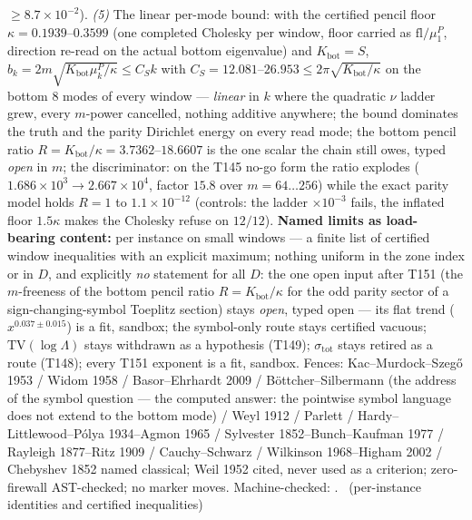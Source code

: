 \documentclass[11pt,a4paper]{article}
\begin{document}
$\ge8.7\times10^{-2}$). \emph{(5)} The linear per-mode bound: with the
certified pencil floor $\kappa=0.1939$--$0.3599$ (one completed Cholesky
per window, floor carried as $\mathrm{fl}/\mu^P_1$, direction re-read on
the actual bottom eigenvalue) and $K_{\mathrm{bot}}=S$,
$b_k=2m\sqrt{K_{\mathrm{bot}}\mu^P_k/\kappa}\le C_Sk$ with
$C_S=12.081$--$26.953\le2\pi\sqrt{K_{\mathrm{bot}}/\kappa}$ on the bottom
$8$ modes of every window --- \emph{linear} in $k$ where the quadratic
$\nu$ ladder grew, every $m$-power cancelled, nothing additive anywhere;
the bound dominates the truth and the parity Dirichlet energy on every
read mode; the bottom pencil ratio
$R=K_{\mathrm{bot}}/\kappa=3.7362$--$18.6607$ is the one scalar the chain
still owes, typed \emph{open} in $m$; the discriminator: on the T145 no-go
form the ratio explodes ($1.686\times10^{3}\to2.667\times10^{4}$, factor
$15.8$ over $m=64\ldots256$) while the exact parity model holds $R=1$ to
$1.1\times10^{-12}$ (controls: the ladder $\times10^{-3}$ fails, the
inflated floor $1.5\kappa$ makes the Cholesky refuse on $12/12$).
\textbf{Named limits as load-bearing content:} per instance on small
windows --- a finite list of certified window inequalities with an explicit
maximum; nothing uniform in the zone index or in $D$, and explicitly
\emph{no} statement for all $D$: the one open input after T151 (the
$m$-freeness of the bottom pencil ratio $R=K_{\mathrm{bot}}/\kappa$ for
the odd parity sector of a sign-changing-symbol Toeplitz section) stays
\emph{open}, typed open --- its flat trend ($x^{0.037\pm0.015}$) is a fit,
sandbox; the symbol-only route stays certified vacuous;
$\mathrm{TV}(\log\Lambda)$ stays withdrawn as a hypothesis (T149);
$\sigma_{\mathrm{tot}}$ stays retired as a route (T148); every T151
exponent is a fit, sandbox. Fences: Kac--Murdock--Szeg\H{o} 1953 / Widom
1958 / Basor--Ehrhardt 2009 / B\"ottcher--Silbermann (the address of the
symbol question --- the computed answer: the pointwise symbol language
does not extend to the bottom mode) / Weyl 1912 / Parlett /
Hardy--Littlewood--P\'olya 1934--Agmon 1965 / Sylvester
1852--Bunch--Kaufman 1977 / Rayleigh 1877--Ritz 1909 / Cauchy--Schwarz /
Wilkinson 1968--Higham 2002 / Chebyshev 1852 named classical; Weil 1952
cited, never used as a criterion; zero-firewall AST-checked; no marker
moves.
Machine-checked: .
\mE\ (per-instance identities and certified inequalities)
\end{document}
